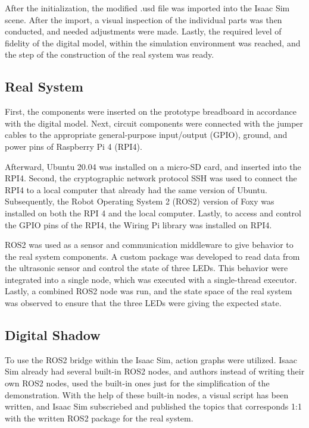 \documentclass[conference]{IEEEtran}
\begin{document}
    After the initialization, the modified .usd file was imported into the Isaac Sim scene. After the import, a visual inspection of the individual parts was then conducted, and needed adjustments were made. Lastly,  the required level of fidelity of the digital model, within the simulation environment was reached, and the step of the construction of the real system was ready.
    \subsection*{Real System}\label{section:real_system}
    First, the components were inserted on the prototype breadboard in accordance with the digital model.
    Next, circuit components were connected with the jumper cables to the appropriate general-purpose input/output (GPIO),
    ground, and power pins of Raspberry Pi 4 (RPI4). 

    Afterward, Ubuntu 20.04 was installed on a micro-SD card, 
    and inserted into the RPI4. Second, the cryptographic network protocol SSH was used to connect the 
    RPI4 to a local computer that already had the same version of Ubuntu. Subsequently, 
    the Robot Operating System 2 (ROS2) version of Foxy was installed on both the RPI 4 and 
    the local computer. Lastly, to access and control the GPIO pins of the RPI4, 
    the Wiring Pi library was installed on RPI4.

    ROS2 was used as a sensor and communication middleware to give behavior to the real system components.
    A custom package was developed to read data from the ultrasonic sensor and control the state of three LEDs. 
    This behavior were integrated into a single node, which was executed with a single-thread executor.
    Lastly, a combined ROS2 node was run, and the state space of the real system was observed to ensure
    that the three LEDs were giving the expected state.

    \subsection*{Digital Shadow}\label{section:digital_shadow}
    

    To use the ROS2 bridge within the Isaac Sim, action graphs were utilized. 
    Isaac Sim already had several built-in ROS2 nodes, and authors instead of writing their own ROS2 nodes, 
    used the built-in ones just for the simplification of the demonstration. 
    With the help of these built-in nodes, a visual script has been written, and Isaac Sim subscriebed
    and published the topics that corresponds 1:1 with  the written ROS2 package for the real system.
\end{document}
